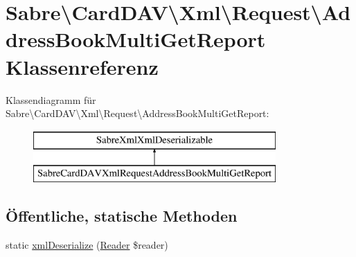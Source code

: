 \hypertarget{class_sabre_1_1_card_d_a_v_1_1_xml_1_1_request_1_1_address_book_multi_get_report}{}\section{Sabre\textbackslash{}Card\+D\+AV\textbackslash{}Xml\textbackslash{}Request\textbackslash{}Address\+Book\+Multi\+Get\+Report Klassenreferenz}
\label{class_sabre_1_1_card_d_a_v_1_1_xml_1_1_request_1_1_address_book_multi_get_report}
Klassendiagramm für Sabre\textbackslash{}Card\+D\+AV\textbackslash{}Xml\textbackslash{}Request\textbackslash{}Address\+Book\+Multi\+Get\+Report\+:\begin{figure}[H]
\begin{center}
\leavevmode
\includegraphics[height=2.000000cm]{class_sabre_1_1_card_d_a_v_1_1_xml_1_1_request_1_1_address_book_multi_get_report}
\end{center}
\end{figure}
\subsection*{Öffentliche, statische Methoden}
\begin{DoxyCompactItemize}
\item 
static \mbox{\hyperlink{class_sabre_1_1_card_d_a_v_1_1_xml_1_1_request_1_1_address_book_multi_get_report_a7d63d7736ac0c6fe905d9db5a1192d92}{xml\+Deserialize}} (\mbox{\hyperlink{class_sabre_1_1_xml_1_1_reader}{Reader}} \$reader)
\end{DoxyCompactItemize}

